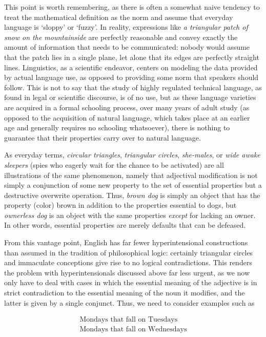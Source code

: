 This point is worth remembering, as there is often a somewhat naive tendency
to treat the mathematical definition as the norm and assume that everyday
language is `sloppy' or `fuzzy'.  In reality, expressions like {\it a
  triangular patch of snow on the mountainside} are perfectly reasonable and
convey exactly the amount of information that needs to be communicated: nobody
would assume that the patch lies in a single plane, let alone that its edges
are perfectly straight lines. Linguistics, as a scientific endeavor, centers
on modeling the data provided by actual language use, as opposed to providing
some norm that speakers should follow.
 This is not to say that the study of highly regulated
technical language, as found in legal or scientific discourse, is of no use,
but as these language varieties are acquired in a formal schooling process,
over many years of adult study (as opposed to the acquisition of natural
language, which takes place at an earlier age and generally requires no
schooling whatsoever), there is nothing to guarantee that their properties
carry over to natural language.

As everyday terms, {\it circular triangles}, {\it triangular circles}, {\it
  she-males}, or {\it wide awake sleepers} (spies who eagerly wait for the
chance to be activated) are all illustrations of the same phenomenon, namely
that adjectival modification is not simply a conjunction of some new property
to the set of essential properties but a destructive overwrite operation.
Thus, {\it brown dog} is simply an object that has the property (color) brown
in addition to the properties essential to dogs, but {\it ownerless dog} is an
object with the same properties {\it except} for lacking an owner. In other
words, essential properties are merely defaults that can be defeased.

From this vantage point, English has far fewer hyperintensional constructions
than assumed in the tradition of philosophical logic: certainly triangular   
circles and immaculate conceptions give rise to no logical contradictions.  
This renders the problem with hyperintensionals discussed above far less
urgent, as we now only have to deal with cases in which the essential meaning
of the adjective is in strict contradiction to the essential meaning of the   
noun it modifies, and the latter is given by a single conjunct. Thus, we need
to consider examples such as

\begin{eqnarray}
\text{Mondays that fall on Tuesdays}\\
\text{Mondays that fall on Wednesdays}
\end{eqnarray}

